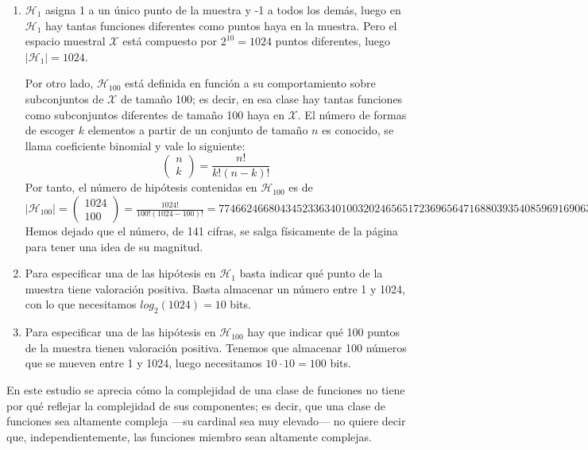 \documentclass[a4paper, 11pt]{article}
\begin{document}
      \begin{solucion}
          \begin{enumerate}
              \item $\mathcal{H}_1$ asigna 1 a un único punto de la muestra y -1 a todos los demás, luego en $\mathcal{H}_1$ hay tantas funciones diferentes como puntos haya en la muestra. Pero el espacio muestral $\mathcal{X}$ está compuesto por $2^{10} = 1024$ puntos diferentes, luego $\vert\mathcal{H}_1\vert = 1024$.

              Por otro lado, $\mathcal{H}_{100}$ está definida en función a su comportamiento sobre subconjuntos de $\mathcal{X}$ de tamaño 100; es decir, en esa clase hay tantas funciones como subconjuntos diferentes de tamaño 100 haya en $\mathcal{X}$. El número de formas de escoger $k$ elementos a partir de un conjunto de tamaño $n$ es conocido, se llama coeficiente binomial y vale lo siguiente:
              \[\begin{pmatrix}
                  n \\
                  k
              \end{pmatrix} = \frac{n!}{k!(n-k)!}
              \]
              Por tanto, el número de hipótesis contenidas en $\mathcal{H}_{100}$ es de $\vert\mathcal{H}_{100}\vert = \begin{pmatrix}
                  1024 \\
                  100
              \end{pmatrix} = \frac{1024!}{100!(1024-100)!} = 774662466804345233634010032024656517236965647168803935408596916906303252199494470709880165045781515893999614469740109324589034524935408592640$
              Hemos dejado que el número, de 141 cifras, se salga físicamente de la página para tener una idea de su magnitud.

              \item Para especificar una de las hipótesis en $\mathcal{H}_1$ basta indicar qué punto de la muestra tiene valoración positiva. Basta almacenar un número entre 1 y 1024, con lo que necesitamos $log_2(1024) = 10$ bits.

              \item Para especificar una de las hipótesis en $\mathcal{H}_{100}$ hay que indicar qué 100 puntos de la muestra tienen valoración positiva. Tenemos que almacenar 100 números que se mueven entre 1 y 1024, luego necesitamos $10\cdot10 = 100$ bits.
          \end{enumerate}

          En este estudio se aprecia cómo la complejidad de una clase de funciones no tiene por qué reflejar la complejidad de sus componentes; es decir, que una clase de funciones sea altamente compleja ---su cardinal sea muy elevado--- no quiere decir que, independientemente, las funciones miembro sean altamente complejas.


\end{solucion}
\end{document}

